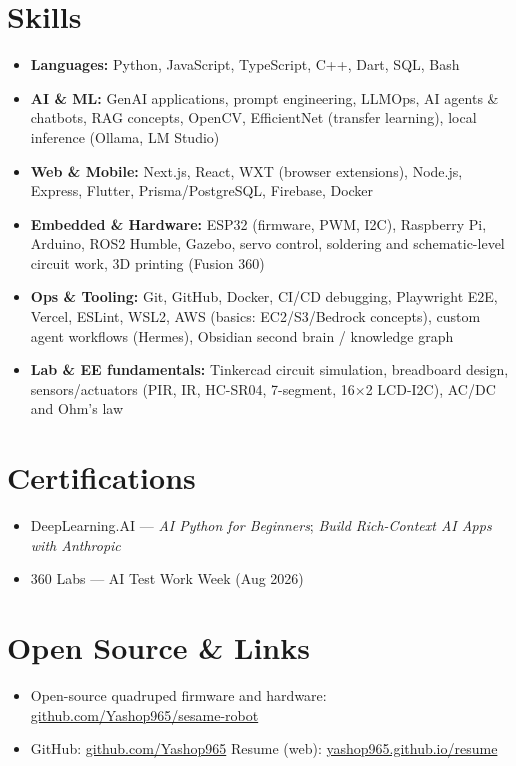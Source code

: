 \documentclass[10pt]{article}
\newcommand{\itemhead}[1]{\textbf{#1}}
\begin{document}
\section{Skills}
\begin{itemize}
  \item \itemhead{Languages:} Python, JavaScript, TypeScript, C++, Dart, SQL, Bash
  \item \itemhead{AI \& ML:} GenAI applications, prompt engineering, LLMOps, AI agents \& chatbots, RAG concepts, OpenCV, EfficientNet (transfer learning), local inference (Ollama, LM Studio)
  \item \itemhead{Web \& Mobile:} Next.js, React, WXT (browser extensions), Node.js, Express, Flutter, Prisma/PostgreSQL, Firebase, Docker
  \item \itemhead{Embedded \& Hardware:} ESP32 (firmware, PWM, I2C), Raspberry Pi, Arduino, ROS2 Humble, Gazebo, servo control, soldering and schematic-level circuit work, 3D printing (Fusion 360)
  \item \itemhead{Ops \& Tooling:} Git, GitHub, Docker, CI/CD debugging, Playwright E2E, Vercel, ESLint, WSL2, AWS (basics: EC2/S3/Bedrock concepts), custom agent workflows (Hermes), Obsidian second brain / knowledge graph
  \item \itemhead{Lab \& EE fundamentals:} Tinkercad circuit simulation, breadboard design, sensors/actuators (PIR, IR, HC-SR04, 7-segment, 16$\times$2 LCD-I2C), AC/DC and Ohm's law
\end{itemize}

\section{Certifications}
\begin{itemize}
  \item DeepLearning.AI --- \textit{AI Python for Beginners}; \textit{Build Rich-Context AI Apps with Anthropic}
  \item 360 Labs --- AI Test Work Week (Aug 2026)
\end{itemize}

\section{Open Source \& Links}
\begin{itemize}
  \item Open-source quadruped firmware and hardware: \href{https://github.com/Yashop965/sesame-robot}{github.com/Yashop965/sesame-robot}
  \item GitHub: \href{https://github.com/Yashop965}{github.com/Yashop965} \textbar{} Resume (web): \href{https://yashop965.github.io/resume/}{yashop965.github.io/resume}
\end{itemize}
\end{document}
